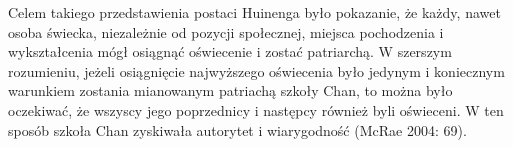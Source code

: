 Celem takiego przedstawienia postaci Huinenga było pokazanie, że każdy, nawet osoba świecka, niezależnie od pozycji społecznej, miejsca pochodzenia i wykształcenia mógł osiągnąć oświecenie i zostać patriarchą. W szerszym rozumieniu, jeżeli osiągnięcie najwyższego oświecenia było jedynym i koniecznym warunkiem zostania mianowanym patriachą szkoły Chan, to można było oczekiwać, że wszyscy jego poprzednicy i następcy również byli oświeceni. W ten sposób szkoła Chan zyskiwała autorytet i wiarygodność (McRae 2004: 69).
